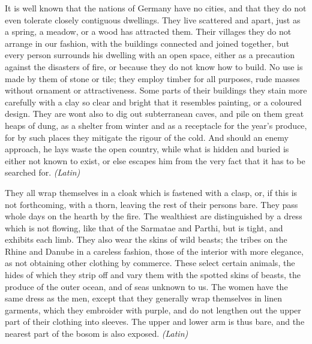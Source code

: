 It is well known that the nations of Germany have no cities, and that they do not even tolerate closely contiguous dwellings. They live scattered and apart, just as a spring, a meadow, or a wood has attracted them. Their villages they do not arrange in our fashion, with the buildings connected and joined together, but every person surrounds his dwelling with an open space, either as a precaution against the disasters of fire, or because they do not know how to build. No use is made by them of stone or tile; they employ timber for all purposes, rude masses without ornament or attractiveness. Some parts of their buildings they stain more carefully with a clay so clear and bright that it resembles painting, or a coloured design. They are wont also to dig out subterranean caves, and pile on them great heaps of dung, as a shelter from winter and as a receptacle for the year's produce, for by such places they mitigate the rigour of the cold. And should an enemy approach, he lays waste the open country, while what is hidden and buried is either not known to exist, or else escapes him from the very fact that it has to be searched for. \emph{(Latin)}


They all wrap themselves in a cloak which is fastened with a clasp, or, if this is not forthcoming, with a thorn, leaving the rest of their persons bare. They pass whole days on the hearth by the fire. The wealthiest are distinguished by a dress which is not flowing, like that of the Sarmatae and Parthi, but is tight, and exhibits each limb. They also wear the skins of wild beasts; the tribes on the Rhine and Danube in a careless fashion, those of the interior with more elegance, as not obtaining other clothing by commerce. These select certain animals, the hides of which they strip off and vary them with the spotted skins of beasts, the produce of the outer ocean, and of seas unknown to us. The women have the same dress as the men, except that they generally wrap themselves in linen garments, which they embroider with purple, and do not lengthen out the upper part of their clothing into sleeves. The upper and lower arm is thus bare, and the nearest part of the bosom is also exposed. \emph{(Latin)}


